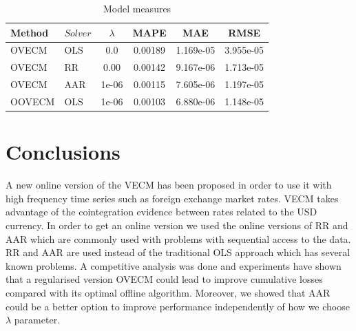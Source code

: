 \documentclass[twocolumn]{svjour3}          %
\begin{document}
\begin{table}[ht!]
\caption{Model measures}
\label{tab:stats}
\begin{center}
\begin{tabular}{|l|l|c|c|c|c|}
\hline
\hline
Method & $Solver$  & $\lambda$ & 
MAPE & MAE& RMSE \\
\hline
 OVECM  &   OLS   &  0.0&  0.00189&  1.169e-05&3.955e-05\\
 OVECM  &   RR   & 0.00 &  0.00142& 9.167e-06 &1.713e-05\\
 OVECM  &   AAR     &  1e-06 &  0.00115&  7.605e-06&1.197e-05\\
 OOVECM  &   OLS    &  1e-06 &  0.00103&  6.880e-06&1.148e-05\\
\hline
\end{tabular}
\end{center}
\end{table}

\section{Conclusions}
\label{sec:conclusions}

A new online version of the VECM has been proposed in order to use it with high frequency time series such as foreign exchange market rates. VECM takes advantage of the cointegration evidence between rates related to the USD currency. In order to get an online version we used the online versions of RR and AAR which are commonly used with problems with sequential access to the data. RR and AAR are used instead of the traditional OLS approach which has several known problems. A competitive analysis was done and experiments have shown that a regularised version OVECM could lead to improve cumulative losses compared with its optimal offline algorithm. Moreover, we showed that AAR could be a better option to improve performance independently of  how we choose $\lambda$ parameter. 


\end{document}
